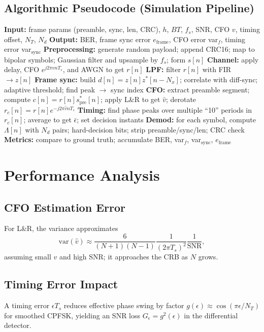 \documentclass[journal]{IEEEtran}
\begin{document}
\subsection{Algorithmic Pseudocode (Simulation Pipeline)}
\begin{algorithm}[t]
\caption{Burst GFSK Receiver Simulation Pipeline}
\begin{algorithmic}[1]
\State \textbf{Input:} frame params (preamble, sync, len, CRC), $h$, $BT$, $f_s$, SNR, CFO $v$, timing offset, $N_T$, $N_d$
\State \textbf{Output:} BER, frame sync error $e_{\text{frame}}$, CFO error var$_f$, timing error var$_{\text{sync}}$
\State \textbf{Preprocessing:} generate random payload; append CRC16; map to bipolar symbols; Gaussian filter and upsample by $f_s$; form $s[n]$
\State \textbf{Channel:} apply delay, CFO $e^{j2\pi v nT_s}$, and AWGN to get $r[n]$
\State \textbf{LPF:} filter $r[n]$ with FIR $\rightarrow z[n]$
\State \textbf{Frame sync:} build $d[n]=z[n]z^{*}[n-N_x]$; correlate with diff-sync; adaptive threshold; find peak $\rightarrow$ sync index
\State \textbf{CFO:} extract preamble segment; compute $c[n]=r[n]s_{\text{pre}}^{*}[n]$; apply L\&R to get $\hat{v}$; derotate $r_c[n]=r[n]e^{-j2\pi \hat{v} nT_s}$
\State \textbf{Timing:} find phase peaks over multiple ``10'' periods in $r_c[n]$; average to get $\bar{\epsilon}$; set decision instants
\State \textbf{Demod:} for each symbol, compute $\Lambda[n]$ with $N_d$ pairs; hard-decision bits; strip preamble/sync/len; CRC check
\State \textbf{Metrics:} compare to ground truth; accumulate BER, var$_f$, var$_{\text{sync}}$, $e_{\text{frame}}$
\end{algorithmic}
\end{algorithm}

\section{Performance Analysis}
\subsection{CFO Estimation Error}
For L\&R, the variance approximates \cite{Bian2003}
\begin{equation}
\mathrm{var}(\hat{v}) \approx \frac{6}{(N+1)(N-1)}\frac{1}{(2\pi T_s)^2}\frac{1}{\mathrm{SNR}},
\end{equation}
assuming small $v$ and high SNR; it approaches the CRB as $N$ grows.

\subsection{Timing Error Impact}
A timing error $\epsilon T_s$ reduces effective phase swing by factor $g(\epsilon)\approx\cos(\pi\epsilon/N_T)$ for smoothed CPFSK, yielding an SNR loss $G_{\epsilon}=g^2(\epsilon)$ in the differential detector.
\end{document}
